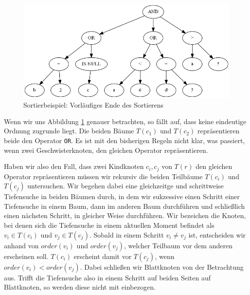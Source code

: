 \begin{figure}
\includegraphics[scale=0.55]{Bilder/sort_exfin1.png}
\caption{Sortierbeispiel: Vorläufiges Ende des Sortierens}
\label{fig:sort_exfin1}
\end{figure}

Wenn wir uns Abbildung \ref{fig:sort_exfin1} genauer betrachten, so fällt auf, dass keine eindeutige Ordnung zugrunde liegt. Die beiden Bäume $T(c_1)$ und $T(c_2)$ repräsentieren beide den Operator \verb|OR|. Es ist mit den bisherigen Regeln nicht klar, was passiert, wenn zwei Geschwisterknoten, den gleichen Operator repräsentieren.

Haben wir also den Fall, dass zwei Kindknoten $c_i,c_j$ von $T(r)$ den gleichen Operator repräsentieren müssen wir rekursiv die beiden Teilbäume $T(c_i)$ und $T(c_j)$ untersuchen. Wir begehen dabei eine gleichzeitge und schrittweise Tiefensuche in beiden Bäumen durch, in dem wir sukzessive einen Schritt einer Tiefensuche in einem Baum, dann im anderen Baum durchführen und schließlich einen nächsten Schritt, in gleicher Weise durchführen. Wir bezeichen die Knoten, bei denen sich die Tiefensuche in einem aktuellen Moment befindet als $v_i\in T(c_i)$ und $v_j\in T(c_j)$. Sobald in einem Schritt $v_i \neq v_j$ ist, entscheiden wir anhand von $\mathit{order}(v_i)$ und $\mathit{order}(v_j)$, welcher Teilbaum vor dem anderen erscheinen soll. $T(c_i)$ erscheint damit vor $T(c_j)$, wenn $\mathit{order}(v_i) < \mathit{order}(v_j)$. Dabei schließen wir Blattknoten von der Betrachtung aus. Trifft die Tiefensuche also in einem Schritt auf beiden Seiten auf Blattknoten, so werden diese nicht mit einbezogen.


